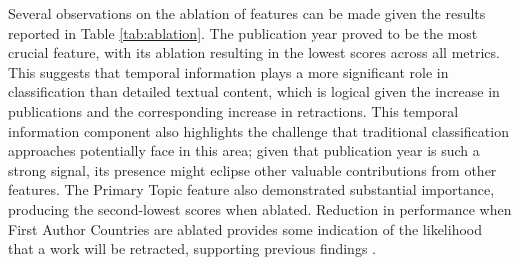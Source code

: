 \documentclass[pdflatex,sn-mathphys-num]{sn-jnl}%
\begin{document}









Several observations on the ablation of features can be made given the results reported in Table \ref{tab:ablation}.
The publication year proved to be the most crucial feature, with its ablation resulting in the lowest scores across all metrics. This suggests that temporal information plays a more significant role in classification than detailed textual content, which is logical given the increase in publications and the corresponding increase in retractions. This temporal information component also highlights the challenge that traditional classification approaches potentially face in this area; given that publication year is such a strong signal, its presence might eclipse other valuable contributions from other features. The Primary Topic feature also demonstrated substantial importance, producing the second-lowest scores when ablated. Reduction in performance when First Author Countries are ablated provides some indication of the likelihood that a work will be retracted, supporting previous findings \cite{stretton_publication_2012}.
\end{document}
